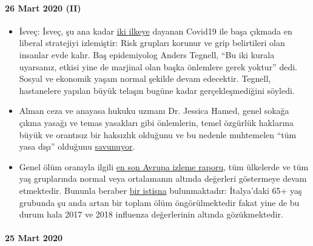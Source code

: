 \hypertarget{26-mart-2020-ii}{%
\paragraph{26 Mart 2020 (II)}\label{26-mart-2020-ii}}

\begin{itemize}
\tightlist
\item
  İsveç: İsveç, şu ana kadar
  \href{https://www.zeit.de/politik/ausland/2020-03/coronavirus-schweden-stockholm-oeffentliches-leben/komplettansicht}{iki
  ilkeye} dayanan Covid19 ile başa çıkmada en liberal stratejiyi
  izlemiştir: Risk grupları korunur ve grip belirtileri olan insanlar
  evde kalır. Baş epidemiyolog Anders Tegnell, ``Bu iki kurala
  uyarsanız, etkisi yine de marjinal olan başka önlemlere gerek yoktur''
  dedi. Sosyal ve ekonomik yaşam normal şekilde devam edecektir.
  Tegnell, hastanelere yapılan büyük telaşın bugüne kadar
  gerçekleşmediğini söyledi.
\item
  Alman ceza ve anayasa hukuku uzmanı Dr. Jessica Hamed, genel sokağa
  çıkma yasağı ve temas yasakları gibi önlemlerin, temel özgürlük
  haklarına büyük ve orantısız bir haksızlık olduğunu ve bu nedenle
  muhtemelen ``tüm yasa dışı'' olduğunu
  \href{https://www.fr.de/politik/coronakrise-deutschland-sind-kontaktsperren-ausgangsbeschraenkungen-rechtswidrig-13611821.html}{savunuyor}.
\item
  Genel ölüm oranıyla ilgili
  \href{https://www.euromomo.eu/index.html}{en son Avrupa izleme
  raporu}, tüm ülkelerde ve tüm yaş gruplarında normal veya ortalamanın
  altında değerleri göstermeye devam etmektedir. Bununla beraber
  \href{https://www.euromomo.eu/outputs/zscore_country65.html}{bir
  istisna} bulunmaktadır: İtalya'daki 65+ yaş grubunda şu anda artan bir
  toplam ölüm öngörülmektedir fakat yine de bu durum hala 2017 ve 2018
  influenza değerlerinin altında gözükmektedir.
\end{itemize}

\hypertarget{25-mart-2020}{%
\paragraph{25 Mart 2020}\label{25-mart-2020}}


